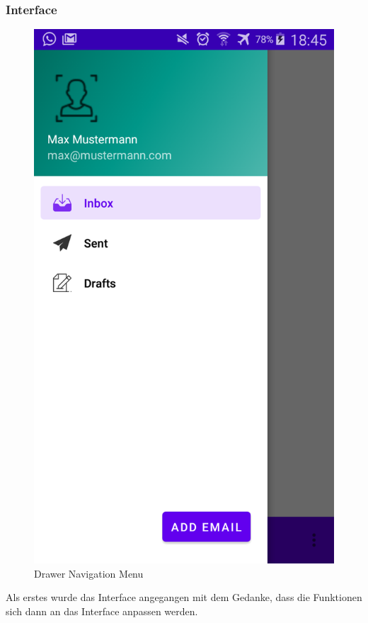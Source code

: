 \documentclass[a4paper,11pt]{article}
\begin{document}
\endgroup

\newpage
\subsubsection{Interface}


\begingroup
\setlength{\intextsep}{1pt}
\setlength{\columnsep}{12pt}

\begin{figure}
\centering
\includegraphics[scale=.15]{media/drawer.png}
\caption{Drawer Navigation Menu}
\end{figure}
Als erstes wurde das Interface angegangen mit dem Gedanke, dass die Funktionen sich dann an das Interface anpassen werden.
\end{document}
